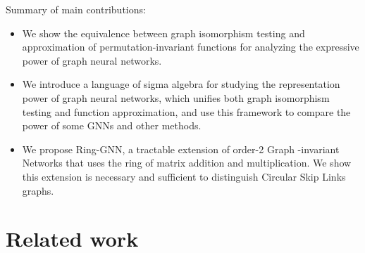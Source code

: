 \documentclass{article}
\begin{document}
Summary of main contributions:
\begin{itemize}
    \item We show the equivalence between graph isomorphism testing and approximation of permutation-invariant functions for analyzing the expressive power of graph neural networks.
    \item We introduce a language of sigma algebra for studying the representation power of graph neural networks, which unifies both graph isomorphism testing and function approximation, and use this framework to compare the power of some GNNs and other methods.
\item We propose Ring-GNN, a tractable extension of order-2 Graph -invariant Networks that uses the ring of matrix addition and multiplication. We show this extension is necessary and sufficient to distinguish Circular Skip Links graphs.
\end{itemize}

\section{Related work}
\end{document}
